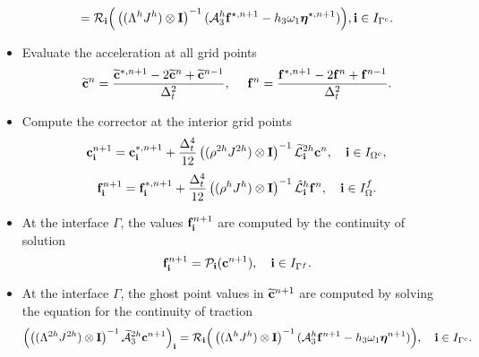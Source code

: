 \begin{breakablealgorithm}
\begin{itemize}
{\begin{equation}
			= {\mathcal{R}}_{\bf i}\Big(\left((\Lambda^hJ^h)\otimes{\bf I}\right)^{-1}(\mathcal{A}_3^h{\bf f}^{\star,n+1}-h_3\omega_1{\bm \eta}^{\star,n+1})\Big), {\bf i}\in I_{\Gamma^c}.
			\end{equation}
		}
		\item{Evaluate the acceleration at all grid points 
			\begin{equation*}
			\widetilde{\bf c}^n= \frac{\widetilde{\bf c}^{*,n+1}-2\widetilde{\bf c}^{n}+\widetilde{\bf c}^{n-1}}{\Delta^2_t},\ \ \ \
			{\bf f}^{n} = \frac{{\bf f}^{*,n+1}-2{\bf f}^{n}+{\bf f}^{n-1}}{\Delta^2_t}.
			\end{equation*}
		}
		\item{Compute the corrector at the interior grid points
			\[{\bf c}^{n+1}_{\bf i} = {\bf c}^{*,n+1}_{\bf i} + \frac{\Delta_t^4}{12}\left((\rho^{2h}J^{2h})\otimes{\bf I}\right)^{-1}\widetilde{\mathcal{L}}^{2h}_{\bf i}{\bf{c}}^{n},\quad {\bf i}\in I_{\Omega^c},\]
			\[{\bf f}^{n+1}_{\bf i} = {\bf f}^{*,n+1}_{\bf i} + \frac{\Delta_t^4}{12}\left((\rho^{h}J^h)\otimes{\bf I}\right)^{-1}\hat{\mathcal{L}}^{h}_{\bf i}{\bf{f}}^{n},\quad {\bf i}\in I_\Omega^f.\]
		}
		\item{At the interface $\Gamma$, the values ${\bf f}^{n+1}_{\bf i}$  are computed by the continuity of solution
			\begin{equation*}
			{\bf f}^{n+1}_{\bf i} = {\mathcal{P}}_{\bf i}({\bf c}^{n+1}), \quad {\bf i}\in I_{\Gamma^f}.
			\end{equation*}
		}
		\item{At the interface $\Gamma$, the ghost point values in $\widetilde{\bf c}^{n+1}$ are computed by solving the equation for the continuity of traction
			\begin{equation}\label{traction_gamma_corr}
			\left(\left((\Lambda^{2h}J^{2h})\otimes{\bf I}\right)^{-1}\wt{\mathcal{A}}_3^{2h}{\bf c}^{n+1}\right)_{\bf i}
			= {\mathcal{R}}_{\bf i}\Big(\left((\Lambda^hJ^h)\otimes{\bf I}\right)^{-1}(\mathcal{A}_3^h{\bf f}^{n+1}-h_3\omega_1{\bm \eta}^{n+1})\Big), \quad {\bf i}\in I_{\Gamma^c}.
			\end{equation}
		}
	\end{itemize}
\end{breakablealgorithm}
~\\

